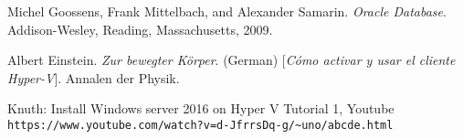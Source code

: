 
\begin{thebibliography}{9}
Michel Goossens, Frank Mittelbach, and Alexander Samarin. 
\textit{Oracle Database}. 
Addison-Wesley, Reading, Massachusetts, 2009.
 
Albert Einstein. 
\textit{Zur  bewegter K{\"o}rper}. (German) 
[\textit{Cómo activar y usar el cliente Hyper-V}]. 
Annalen der Physik.
 
Knuth:  Install Windows server 2016 on Hyper V Tutorial 1, Youtube
\\\texttt{https://www.youtube.com/watch?v=d-JfrrsDq-g/\~{}uno/abcde.html}
\end{thebibliography}